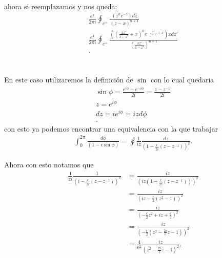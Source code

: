 \documentclass{report}
\begin{document}
  ahora si reemplazamos y nos queda:
  \begin{align*}
   \frac{e^{x}}{2\pi i}\oint_{c^{+}}\frac{\left( z^{n}e^{-z} \right)dz }{\left( z-x \right)^{n+1} } \\
   \frac{e^{x}}{2\pi i}\oint_{c^{+}}\frac{\left( \left( \frac{xz'}{1-z'}+x \right)^{n}e^{-\frac{xz'}{1-z'}+x} \right)xdz' }{\left( \frac{xz'}{1-z'} \right)^{n+1} } \\
  .\end{align*}

  \chapter{}

  En este caso utilizaremos la definición de $\sin$ con lo cual quedaria
  \begin{align*}
    \sin\phi = \frac{e^{i\phi}-e^{-i\phi}}{2i}=\frac{z-z^{-1}}{2i}\\
    z = e^{i\phi}\\
    dz = ie^{i\phi}=izd\phi \\
  .\end{align*}
  con esto ya podemos encontrar una equivalencia con la que trabajar
  \begin{align*}
   \int_{0}^{2\pi} \frac{d\phi}{\left( 1-\epsilon\sin\phi \right) } = \oint \frac{1}{iz}\frac{dz}{\left( 1-\frac{\epsilon}{2i}\left( z-z^{-1} \right)  \right)^2}
  .\end{align*}
    
  Ahora con esto notamos que 
  \begin{align*}
    \frac{1}{zi}\frac{1}{\left( i-\frac{\epsilon}{2i}\left( z-z^{-1} \right)  \right)^2} &= \frac{iz}{\left( iz\left( 1-\frac{\epsilon}{2i}\left( z-z^{-1} \right)  \right)  \right)^2} \\
    &= \frac{iz}{\left( iz - \frac{\epsilon}{2}\left( z^2-1 \right)  \right)^2} \\
    &= \frac{iz}{\left(-\frac{\epsilon}{2}z^2+iz+\frac{\epsilon}{z}\right)^2} \\
    &= \frac{iz}{\left( -\frac{\epsilon}{2}\left( z^2-\frac{2i}{\epsilon}z-1 \right)  \right) ^2} \\
    &= \frac{4}{\epsilon^2}\frac{iz}{\left( z^2-\frac{2i}{\epsilon}z-1 \right)^2}
  .\end{align*}
\end{document}
